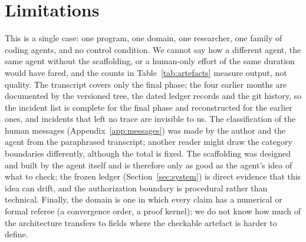\section*{Limitations}
This is a single case: one program, one domain, one researcher, one family of coding agents, and no
control condition. We cannot say how a different agent, the same agent without the scaffolding, or a
human-only effort of the same duration would have fared, and the counts in Table~\ref{tab:artefacts}
measure output, not quality. The transcript covers only the final phase; the four earlier months are
documented by the versioned tree, the dated ledger records and the git history, so the incident list
is complete for the final phase and reconstructed for the earlier ones, and incidents that left no
trace are invisible to us. The classification of the human messages (Appendix~\ref{app:messages}) was
made by the author and the agent from the paraphrased transcript; another reader might draw the
category boundaries differently, although the total is fixed. The scaffolding was designed and built
by the agent itself and is therefore only as good as the agent's idea of what to check; the frozen
ledger (Section~\ref{sec:system}) is direct evidence that this idea can drift, and the authorization
boundary is procedural rather than technical. Finally, the domain is one in which every claim has a
numerical or formal referee (a convergence order, a proof kernel); we do not know how much of the
architecture transfers to fields where the checkable artefact is harder to define.
